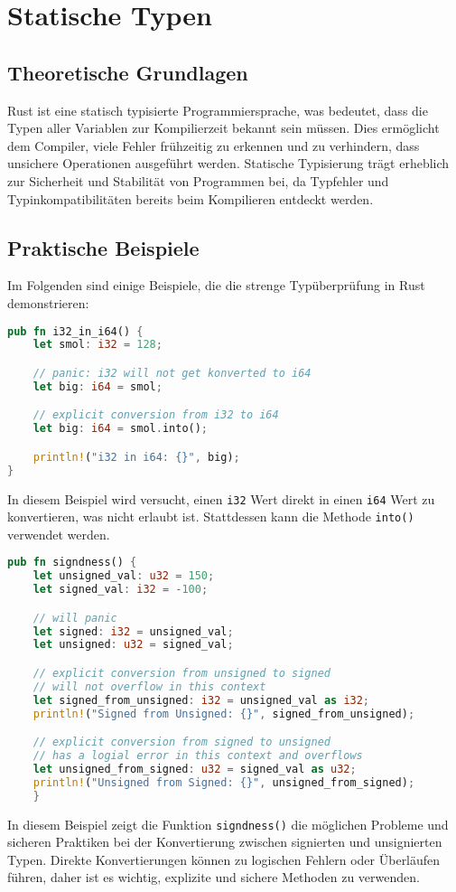 
\chapter{Statische Typen}

\section{Theoretische Grundlagen}

Rust ist eine statisch typisierte Programmiersprache, was bedeutet, dass die Typen aller Variablen zur Kompilierzeit bekannt sein müssen. Dies ermöglicht dem Compiler, viele Fehler frühzeitig zu erkennen und zu verhindern, dass unsichere Operationen ausgeführt werden. Statische Typisierung trägt erheblich zur Sicherheit und Stabilität von Programmen bei, da Typfehler und Typinkompatibilitäten bereits beim Kompilieren entdeckt werden.

\section{Praktische Beispiele}

Im Folgenden sind einige Beispiele, die die strenge Typüberprüfung in Rust demonstrieren:

\begin{lstlisting}[language=Rust, caption={i32 in i64}]
pub fn i32_in_i64() {
    let smol: i32 = 128;

    // panic: i32 will not get konverted to i64
    let big: i64 = smol;

    // explicit conversion from i32 to i64 
    let big: i64 = smol.into();

    println!("i32 in i64: {}", big);
}
\end{lstlisting}

\noindent
In diesem Beispiel wird versucht, einen \texttt{i32} Wert direkt in einen \texttt{i64} Wert zu konvertieren, was nicht erlaubt ist. Stattdessen kann die Methode \texttt{into()} verwendet werden.

\begin{lstlisting}[language=Rust, caption={Signiertheit}]
pub fn signdness() {
    let unsigned_val: u32 = 150;
    let signed_val: i32 = -100;

    // will panic 
    let signed: i32 = unsigned_val;
    let unsigned: u32 = signed_val;

    // explicit conversion from unsigned to signed
    // will not overflow in this context
    let signed_from_unsigned: i32 = unsigned_val as i32;
    println!("Signed from Unsigned: {}", signed_from_unsigned);

    // explicit conversion from signed to unsigned
    // has a logial error in this context and overflows
    let unsigned_from_signed: u32 = signed_val as u32;
    println!("Unsigned from Signed: {}", unsigned_from_signed); 
    }
\end{lstlisting}
\noindent
In diesem Beispiel zeigt die Funktion \texttt{signdness()} die möglichen Probleme und sicheren Praktiken bei der Konvertierung zwischen signierten und unsignierten Typen. Direkte Konvertierungen können zu logischen Fehlern oder Überläufen führen, daher ist es wichtig, explizite und sichere Methoden zu verwenden.

